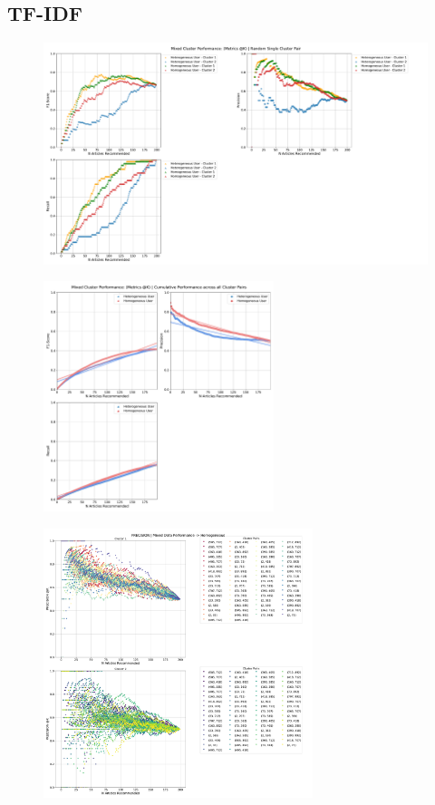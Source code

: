 \documentclass[a4paper,fontsize=8.0pt]{scrartcl}
\begin{document}
\subsection{TF-IDF}
\begin{figure}[H]
    \includegraphics[width=1.0\textwidth]{Graphs/TFIDF/user_interaction_vs_model_performance_mixed_cluster.pdf}
\end{figure}
\begin{figure}[H]
 \includegraphics[width=0.6\textwidth]{Graphs/TFIDF/user_interaction_vs_model_performance_cumu_mixed_cluster.pdf}
\end{figure}
\begin{figure}[H]
 \includegraphics[width=0.7\textwidth]{Graphs/TFIDF/user_interaction_vs_model_performance_precision_all_cps_mixed_data_sep_Homogeneous.pdf}
\end{figure}
\end{document}
